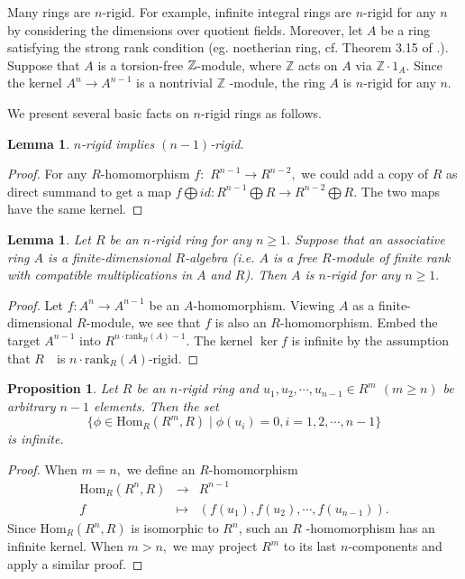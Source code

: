 \documentclass{gtpart}     %
\newtheorem{lemma}[theorem]{Lemma}
\newtheorem{proposition}[theorem]{Proposition}
\begin{document}
Many rings are $n$-rigid. For example, infinite integral rings are $n$-rigid
for any $n$ by considering the dimensions over quotient fields. Moreover,
let $A$ be a ring satisfying the strong rank condition (eg. noetherian ring,
cf. Theorem 3.15 of \cite{la}.). Suppose that $A$ is a torsion-free $\mathbb{%
Z}$-module, where $\mathbb{Z}$ acts on $A$ via $\mathbb{Z}\cdot 1_{A}$.
Since the kernel $A^{n}\rightarrow A^{n-1}$ is a nontrivial $\mathbb{Z}$%
-module, the ring $A$ is $n$-rigid for any $n.$

We present several basic facts on $n$-rigid rings as follows.

\begin{lemma}
\label{subn}$n$-rigid implies $(n-1)$-rigid.
\end{lemma}

\begin{proof}
For any $R$-homomorphism $f:$ $R^{n-1}\rightarrow R^{n-2},$ we could add a
copy of $R$ as direct summand to get a map $f\bigoplus id:R^{n-1}\bigoplus
R\rightarrow R^{n-2}\bigoplus R.$ The two maps have the same kernel.
\end{proof}

\begin{lemma}
\label{exte}Let $R$ be an $n$-rigid ring for any $n\geq 1.$ Suppose that an
associative ring $A$ is a finite-dimensional $R$-algebra (i.e. $A$ is a free
$R$-module of finite rank with compatible multiplications in $A$ and $R$).
Then $A$ is $n$-rigid for any $n\geq 1.$
\end{lemma}

\begin{proof}
Let $f:A^{n}\rightarrow A^{n-1}$ be an $A$-homomorphism. Viewing $A$ as a
finite-dimensional $R$-module, we see that $f$ is also an $R$-homomorphism.
Embed the target $A^{n-1}$ into $R^{n\cdot \mathrm{rank}_{R}(A)-1}.$ The
kernel $\ker f$ is infinite by the assumption that $R\quad $is $n\cdot
\mathrm{rank}_{R}(A)$-rigid.
\end{proof}

\begin{proposition}
\label{prop}Let $R$ be an $n$-rigid ring and $u_{1},u_{2},\cdots ,u_{n-1}\in
R^{m}$ $(m\geq n)$ be arbitrary $n-1$ elements. Then the set%
\begin{equation*}
\{\phi \in \mathrm{Hom}_{R}(R^{m},R)\mid \phi (u_{i})=0,i=1,2,\cdots ,n-1\}
\end{equation*}%
is infinite.\bigskip
\end{proposition}

\begin{proof}
When $m=n,$ we define an $R$-homomorphism%
\begin{eqnarray*}
\mathrm{Hom}_{R}(R^{n},R) &\rightarrow &R^{n-1} \\
f &\longmapsto &(f(u_{1}),f(u_{2}),\cdots ,f(u_{n-1})).
\end{eqnarray*}%
Since $\mathrm{Hom}_{R}(R^{n},R)$ is isomorphic to $R^{n}$, such an $R$%
-homomorphism has an infinite kernel. When $m>n,$ we may project $R^{m}$ to
its last $n$-components and apply a similar proof.
\end{proof}
\end{document}
